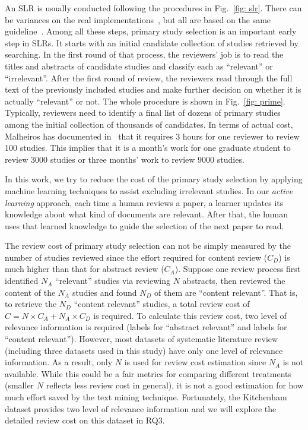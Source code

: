 \documentclass{svjour3}
\theoremstyle{break}
\begin{document}
An SLR is usually conducted following the procedures in Fig.~\ref{fig: slr}. There can be variances on the real
implementations~\cite{wahono2015systematic,malhotra2015systematic,radjenovic2013software,unterkalmsteiner2012evaluation,hall2012systematic},
but all are based on the same guideline~\cite{keele2007guidelines}. Among all these steps, primary study selection is an important early step in SLRs. It starts with an initial candidate collection of studies retrieved by searching. In the first round of that process,
the reviewers' job is to read the titles and abstracts of candidate studies and classify each as ``relevant'' or ``irrelevant''. After the first round of review, the reviewers read through the full text of the previously included studies and make further decision on whether it is actually ``relevant'' or not. The whole procedure is shown in Fig.~\ref{fig: prime}. Typically, reviewers need to identify a final list of dozens of primary studies
among the initial collection of thousands of candidates. In terms of actual
cost, Malheiros has documented in~\cite{malheiros2007visual} that it requires 3
hours for one reviewer to review 100 studies.  This implies that it is a month's
work for one graduate student to review 3000 studies or three months' work to
review 9000 studies. 

In this work, we try to reduce the cost of the primary study selection by applying machine learning techniques to assist excluding irrelevant studies. In our {\em active learning} approach, each time a human reviews a paper, a learner updates its knowledge about what kind of documents are relevant. After that, the human uses that learned knowledge to guide the selection of the next paper to read.

The review cost of primary study selection can not be simply measured by the number of studies reviewed since the effort required for content review ($C_D$) is much higher than that for abstract review ($C_A$). Suppose one review process first identified $N_A$ ``relevant'' studies via reviewing $N$ abstracts, then reviewed the content of the $N_A$ studies and found $N_D$ of them are ``content relevant''. That is, to retrieve the $N_D$ ``content relevant'' studies, a total review cost of $C=N\times C_A+N_A\times C_D$ is required. To calculate this review cost, two level of relevance information is required (labels for ``abstract relevant'' and labels for ``content relevant''). However, most datasets of systematic literature review (including three datasets used in this study) have only one level of relevance information. As a result, only $N$ is used for review cost estimation since $N_A$ is not available. While this could be a fair metrics for comparing different treatments (smaller $N$ reflects less review cost in general), it is not a good estimation for how much effort saved by the text mining technique. Fortunately, the Kitchenham dataset provides two level of relevance information and we will explore the detailed review cost on this dataset in RQ3.
\end{document}
